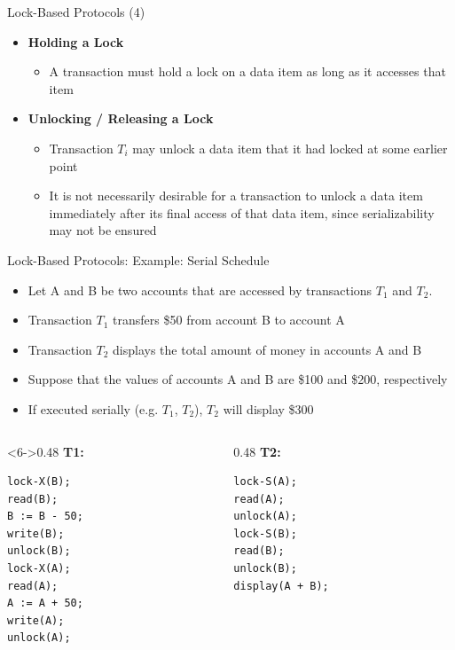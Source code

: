\documentclass[aspectratio=169, xcolor=dvipsnames]{beamer}
\begin{document}
\begin{frame}{Lock-Based Protocols (4)}
    \begin{itemize}[<+->]
        \item \textbf{Holding a Lock}
        \begin{itemize}
            \item[$\triangleright$] A transaction must hold a lock on a data item as long as it accesses that item
        \end{itemize}
        \item \textbf{Unlocking / Releasing a Lock}
        \begin{itemize}
            \item[$\triangleright$] Transaction $T_i$ may unlock a data item that it had locked at some earlier point
            \item[$\triangleright$] It is not necessarily desirable for a transaction to unlock a data item immediately after its final access of that data item, since serializability may not be ensured
        \end{itemize}
    \end{itemize}
\end{frame}

\begin{frame}[fragile]{Lock-Based Protocols: Example: Serial Schedule}
    \begin{itemize}[<+->]
        \item Let A and B be two accounts that are accessed by transactions $T_1$ and $T_2$.
        \item Transaction $T_1$ transfers \$50 from account B to account A
        \item Transaction $T_2$ displays the total amount of money in accounts A and B
        \item Suppose that the values of accounts A and B are \$100 and \$200, respectively
        \item If executed serially (e.g. $T_1$, $T_2$), $T_2$ will display \$300
    \end{itemize}
        \begin{columns}[T]
            \begin{column}<6->{0.48\textwidth}
                \textbf{T1:}
                \begin{lstlisting}
lock-X(B);
read(B); 
B := B - 50; 
write(B); 
unlock(B); 
lock-X(A); 
read(A); 
A := A + 50; 
write(A); 
unlock(A);
                \end{lstlisting}
            \end{column}
            \begin{column}{0.48\textwidth}
                \textbf{T2:}
                \begin{lstlisting}
lock-S(A); 
read(A); 
unlock(A); 
lock-S(B); 
read(B); 
unlock(B); 
display(A + B);
                \end{lstlisting}
            \end{column}
        \end{columns}
\end{frame}
\end{document}
